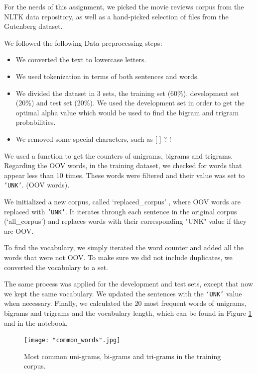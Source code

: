 \documentclass[11pt, a4paper]{article}
\begin{document}
	For the needs of this assignment, we picked the movie reviews corpus from the NLTK data repository, as well as a hand-picked selection of files from the Gutenberg dataset. 
	
	We followed the following Data preprocessing steps:
	
	\begin{itemize}
		\item We converted the text to lowercase letters.
		\item We used tokenization in terms of both sentences and words.
		\item We divided the dataset in 3 sets, the training set (60\%), development set (20\%) and test set (20\%). We used the development set in order to get the optimal alpha value which would be used to find the bigram and trigram probabilities.
		\item We removed some special characters, such as [ ] ? !
		
	\end{itemize}

	
	We used a function to get the counters of unigrams, bigrams and trigrams.  Regarding the OOV words, in the training dataset, we checked for words that appear less than 10 times. These words were filtered and their value was set to \texttt{'UNK'}. (OOV words).
	
	We initialized a new corpus, called ‘replaced\_corpus’ , where  OOV words are replaced with \texttt{'UNK'}. It iterates through each sentence in the original corpus (‘all\_corpus’) and replaces words with their corresponding "UNK" value if they are OOV.
	
	To find the vocabulary, we simply iterated the word counter and added all the words that were not OOV. To make sure we did not include duplicates, we converted the vocabulary to a set.
	
	The same process was applied for the development and test sets, except that now we kept the same vocabulary. We updated the sentences with the \texttt{‘UNK’} value when necessary. Finally, we calculated the 20 most frequent words of unigrams, bigrams and trigrams and the vocabulary length, which can be found in Figure \ref{fig::common_words} and in the notebook.
	

	 \begin{figure}
	    \centering
	    \texttt{[image: "common\_words".jpg]}
	    \caption{Most common uni-grams, bi-grams and tri-grams in the training corpus.}
	    \label{fig::common_words}
	\end{figure}
	
\end{document}
